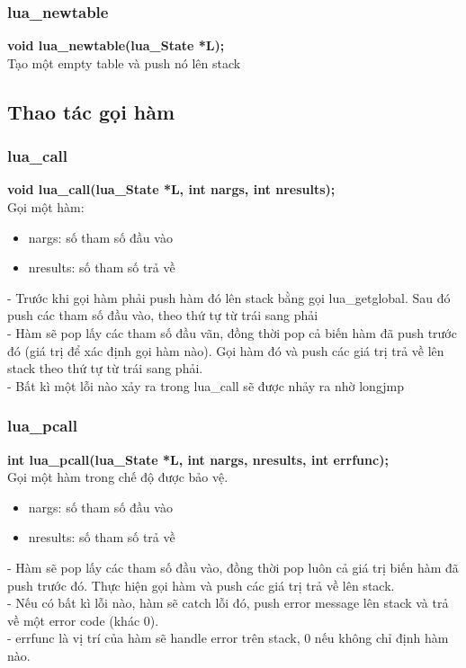 \documentclass[12pt]{article}
\begin{document}
\subsubsection{lua\_newtable}
\textbf{void lua\_newtable(lua\_State *L);} \\
Tạo một empty table và push nó lên stack

\subsection{Thao tác gọi hàm}
\subsubsection{lua\_call}
\textbf{void lua\_call(lua\_State *L, int nargs, int nresults);} \\
Gọi một hàm:
\begin{itemize}
\item nargs: số tham số đầu vào
\item nresults: số tham số trả về
\end{itemize}
- Trước khi gọi hàm phải push hàm đó lên stack bằng gọi lua\_getglobal. Sau đó push các tham số đầu vào, theo thứ tự từ trái sang phải \\
- Hàm sẽ pop lấy các tham số đầu vãn, đồng thời pop cả biến hàm đã push trước đó (giá trị để xác định gọi hàm nào). Gọi hàm đó và push các giá trị trả về lên stack theo thứ tự từ trái sang phải. \\
- Bất kì một lỗi nào xảy ra trong lua\_call sẽ được nhảy ra nhờ longjmp


\subsubsection{lua\_pcall} 
\textbf{int lua\_pcall(lua\_State *L, int nargs, nresults, int errfunc);} \\
Gọi một hàm trong chế độ được bảo vệ.
\begin{itemize}
\item nargs: số tham số đầu vào 
\item nresults: số tham số trả về 
\end{itemize}
- Hàm sẽ pop lấy các tham số đầu vào, đồng thời pop luôn cả giá trị biến hàm đã push trước đó. Thực hiện gọi hàm và push các giá trị trả về lên stack. \\
- Nếu có bất kì lỗi nào, hàm sẽ catch lỗi đó, push error message lên stack và trả về một error code (khác 0). \\
 - errfunc là vị trí của hàm sẽ handle error trên stack, 0 nếu không chỉ định hàm nào.  
\end{document}
